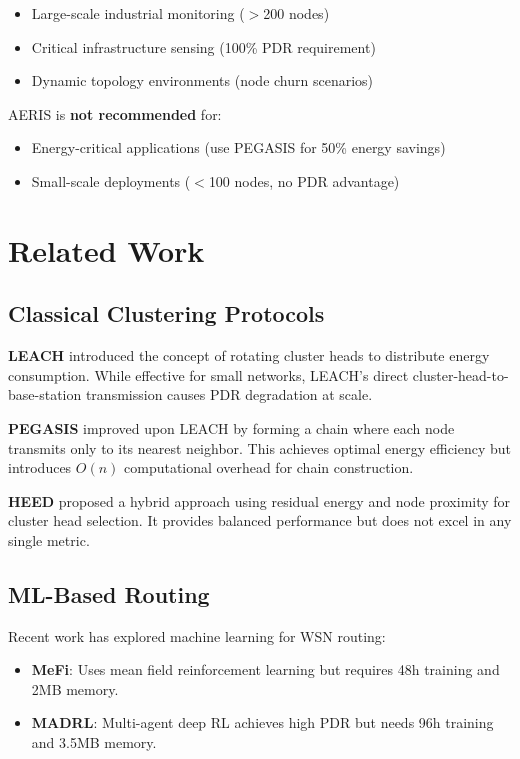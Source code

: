\documentclass[twocolumn]{article}
\begin{document}
\begin{itemize}
    \item Large-scale industrial monitoring ($>$200 nodes)
    \item Critical infrastructure sensing (100\% PDR requirement)
    \item Dynamic topology environments (node churn scenarios)
\end{itemize}

AERIS is \textbf{not recommended} for:
\begin{itemize}
    \item Energy-critical applications (use PEGASIS for 50\% energy savings)
    \item Small-scale deployments ($<$100 nodes, no PDR advantage)
\end{itemize}

\section{Related Work}
\label{sec:related}

\subsection{Classical Clustering Protocols}

\textbf{LEACH} introduced the concept of rotating cluster heads to distribute
energy consumption. While effective for small networks, LEACH's direct
cluster-head-to-base-station transmission causes PDR degradation at scale.

\textbf{PEGASIS} improved upon LEACH by forming a chain where each node
transmits only to its nearest neighbor. This achieves optimal energy efficiency
but introduces $O(n)$ computational overhead for chain construction.

\textbf{HEED} proposed a hybrid approach using residual energy and node
proximity for cluster head selection. It provides balanced performance but
does not excel in any single metric.

\subsection{ML-Based Routing}

Recent work has explored machine learning for WSN routing:
\begin{itemize}
    \item \textbf{MeFi}: Uses mean field reinforcement learning but requires
    48h training and 2MB memory.
    \item \textbf{MADRL}: Multi-agent deep RL achieves high PDR but needs
    96h training and 3.5MB memory.
\end{itemize}
\end{document}
